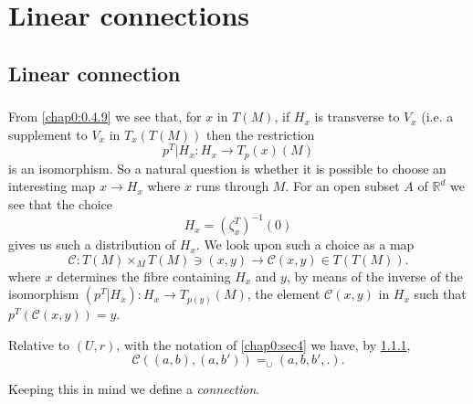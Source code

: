 \chapter{Linear connections}

\section{Linear connection}\label{chap2:sec1}\pageoriginale

\subsection{}\label{chap2:2.1.1}

\begin{defi*}
From \ref{chap0:0.4.9} we see that, for $x$ in $T(M)$, if $H_{x}$ is
transverse to $V_{x}$ (i.e. a supplement to $V_{x}$ in $T_{x}(T(M))$
then the restriction
$$
p^{T}|H_{x}:H_{x}\to T_{p}(x)(M)
$$
is an isomorphism. So a natural question is whether it is possible to
choose an interesting map $x\to H_{x}$ where $x$ runs through $M$. For
an open subset $A$ of $\mathbb{R}^{d}$ we see that the choice
\begin{equation*}
H_{x}=(\zeta^{T}_{x})^{-1}(0)\tag{2.1.2}\label{chap2:2.1.2}
\end{equation*}
gives us such a distribution of $H_{x}$. We look upon such a choice as
a map
\begin{equation*}
\mathcal{C}:T(M)\mathop{\times}_{M}T(M)\ni (x,y)\to
\mathcal{C}(x,y)\in T(T(M)).\tag{2.1.3}\label{chap2:2.1.3}
\end{equation*}
where $x$ determines the fibre containing $H_{x}$ and $y$, by means of
the inverse of the isomorphism $(p^{T}|H_{x}):H_{x}\to T_{p(y)}(M)$,
the element $\mathcal{C}(x,y)$ in $H_{x}$ such that
$p^{T}(\mathcal{C}(x,y))=y$.
\end{defi*}

Relative to $(U,r)$, with the notation of \ref{chap0:sec4} we have, by
\ref{chap2:2.1.1},
\begin{equation*}
\mathcal{C}((a,b),(a,b'))\mathop{=}_{\cup}
(a,b,b',.).\tag{2.1.4}\label{chap2:2.1.4} 
\end{equation*}

Keeping this in mind we define a {\em connection}.

\setcounter{subsection}{4}

\subsection{}\label{chap2:2.1.5} 

